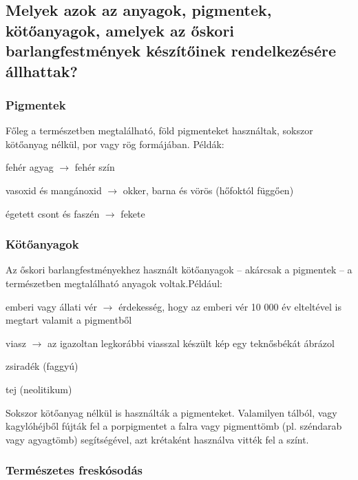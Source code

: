 	\subsection{Melyek azok az anyagok, pigmentek, kötőanyagok, amelyek az őskori barlangfestmények készítőinek rendelkezésére állhattak?}
	
		\subsubsection{Pigmentek}
		
		Főleg a természetben megtalálható, föld pigmenteket használtak, sokszor kötőanyag nélkül, por vagy rög formájában. Példák:
		\begin{compactitem}
			\item fehér agyag $\rightarrow$ fehér szín
			\item vasoxid és mangánoxid $\rightarrow$ okker, barna és vörös (hőfoktól függően)
			\item égetett csont és faszén $\rightarrow$ fekete
		\end{compactitem}
	
		\subsubsection{Kötőanyagok}
		
		Az őskori barlangfestményekhez használt kötőanyagok -- akárcsak a pigmentek -- a természetben megtalálható anyagok voltak.Például:
		\begin{compactitem}
			\item emberi vagy állati vér $\rightarrow$ érdekesség, hogy az emberi vér 10 000 év elteltével is megtart valamit a pigmentből
			\item viasz $\rightarrow$ az igazoltan legkorábbi viasszal készült kép egy teknősbékát ábrázol
			\item zsiradék (faggyú)
			\item tej (neolitikum)
		\end{compactitem}
		
		Sokszor kötőanyag nélkül is használták a pigmenteket. Valamilyen tálból, vagy kagylóhéjből fújták fel a porpigmentet a falra vagy pigmenttömb (pl. széndarab vagy agyagtömb) segítségével, azt krétaként használva vitték fel a színt.
		
		\subsubsection{Természetes freskósodás}
		
